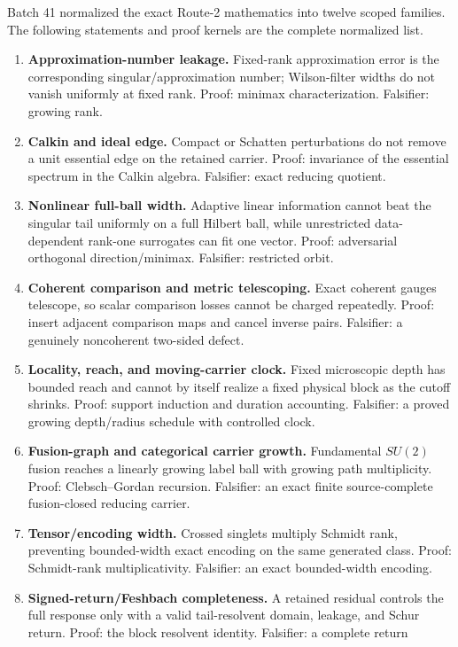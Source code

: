 \documentclass[11pt,oneside]{report}
\theoremstyle{definition}
\theoremstyle{remark}
\begin{document}
Batch 41 normalized the exact Route-2 mathematics into twelve scoped families.
The following statements and proof kernels are the complete normalized list.

\begin{enumerate}[label=\textbf{F\arabic*.}]
\item \textbf{Approximation-number leakage.} Fixed-rank approximation error is
the corresponding singular/approximation number; Wilson-filter widths do not
vanish uniformly at fixed rank. Proof: minimax characterization. Falsifier:
growing rank.
\item \textbf{Calkin and ideal edge.} Compact or Schatten perturbations do not
remove a unit essential edge on the retained carrier. Proof: invariance of the
essential spectrum in the Calkin algebra. Falsifier: exact reducing quotient.
\item \textbf{Nonlinear full-ball width.} Adaptive linear information cannot
beat the singular tail uniformly on a full Hilbert ball, while unrestricted
data-dependent rank-one surrogates can fit one vector. Proof: adversarial
orthogonal direction/minimax. Falsifier: restricted orbit.
\item \textbf{Coherent comparison and metric telescoping.} Exact coherent
gauges telescope, so scalar comparison losses cannot be charged repeatedly.
Proof: insert adjacent comparison maps and cancel inverse pairs. Falsifier:
a genuinely noncoherent two-sided defect.
\item \textbf{Locality, reach, and moving-carrier clock.} Fixed microscopic
depth has bounded reach and cannot by itself realize a fixed physical block as
the cutoff shrinks. Proof: support induction and duration accounting.
Falsifier: a proved growing depth/radius schedule with controlled clock.
\item \textbf{Fusion-graph and categorical carrier growth.} Fundamental
$SU(2)$ fusion reaches a linearly growing label ball with growing path
multiplicity. Proof: Clebsch--Gordan recursion. Falsifier: an exact finite
source-complete fusion-closed reducing carrier.
\item \textbf{Tensor/encoding width.} Crossed singlets multiply Schmidt rank,
preventing bounded-width exact encoding on the same generated class. Proof:
Schmidt-rank multiplicativity. Falsifier: an exact bounded-width encoding.
\item \textbf{Signed-return/Feshbach completeness.} A retained residual controls
the full response only with a valid tail-resolvent domain, leakage, and Schur
return. Proof: the block resolvent identity. Falsifier: a complete return

\end{enumerate}
\end{document}
